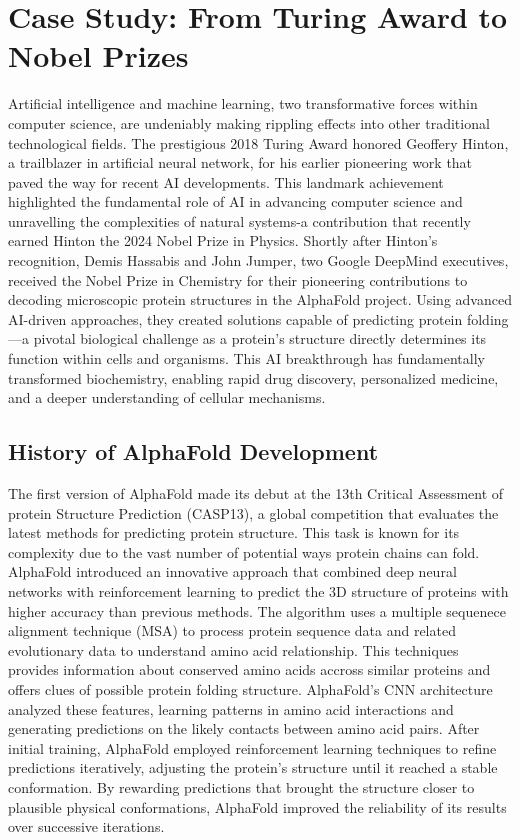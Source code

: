 \documentclass[a4paper]{article}
\begin{document}
\section{Case Study: From Turing Award to Nobel Prizes}
Artificial intelligence and machine learning, two transformative forces within computer science, are undeniably making rippling effects into other traditional technological fields. The prestigious 2018 Turing Award honored Geoffery Hinton, a trailblazer in artificial neural network, for his earlier pioneering work that paved the way for recent AI developments. This landmark achievement highlighted the fundamental role of AI in advancing computer science and unravelling the complexities of natural systems-a contribution that recently earned Hinton the 2024 Nobel Prize in Physics. Shortly after Hinton's recognition, Demis Hassabis and John Jumper, two Google DeepMind executives, received the Nobel Prize in Chemistry for their pioneering contributions to decoding microscopic protein structures in the AlphaFold project.
Using advanced AI-driven approaches, they created solutions capable of predicting protein folding—a pivotal biological challenge as a protein’s structure directly determines its function within cells and organisms. This AI breakthrough has fundamentally transformed biochemistry, enabling rapid drug discovery, personalized medicine, and a deeper understanding of cellular mechanisms.

\subsection{History of AlphaFold Development}

The first version of AlphaFold \cite{senior_improved_2020} made its debut at the 13th Critical Assessment of protein Structure Prediction (CASP13), a global competition that evaluates the latest methods for predicting protein structure. This task is known for its complexity due to the vast number of potential ways protein chains can fold. AlphaFold introduced an innovative approach that combined deep neural networks with reinforcement learning to predict the 3D structure of proteins with higher accuracy than previous methods. The algorithm uses a multiple sequenece alignment technique (MSA) to process protein sequence data and related evolutionary data to understand amino acid relationship. This techniques provides information about conserved amino acids accross similar proteins and offers clues of possible protein folding structure. AlphaFold’s CNN architecture analyzed these features, learning patterns in amino acid interactions and generating predictions on the likely contacts between amino acid pairs. After initial training, AlphaFold employed reinforcement learning techniques to refine predictions iteratively, adjusting the protein’s structure until it reached a stable conformation. By rewarding predictions that brought the structure closer to plausible physical conformations, AlphaFold improved the reliability of its results over successive iterations.
\end{document}
